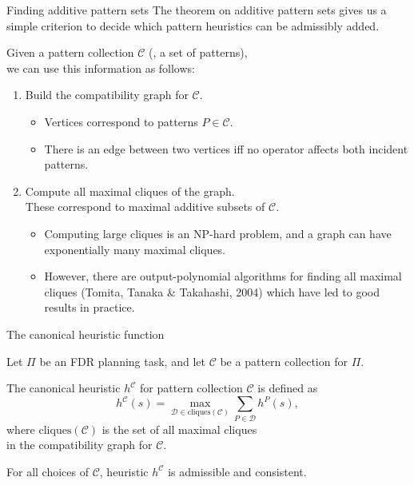 \documentclass{gkibeamer}
\newcommand{\cliques}{\ensuremath{\textrm{cliques}}}
\begin{document}
\begin{frame}{Finding additive pattern sets}
  The theorem on additive pattern sets gives us a simple criterion to
  decide which pattern heuristics can be admissibly added.

  \smallskip

  Given a \alert{pattern collection $\mathcal C$} (\ie, a set of
  patterns), \\ we can use this information as follows:
  \begin{enumerate}
  \item Build the \alert{compatibility graph} for $\mathcal C$.
    \begin{itemize}
    \item Vertices correspond to patterns $P \in \mathcal C$.
    \item There is an edge between two vertices iff no operator
      affects both incident patterns.
    \end{itemize}
  \item Compute \alert{all maximal cliques} of the graph. \\
    These correspond to maximal additive subsets of $\mathcal C$.
    \begin{itemize}
    \item Computing large cliques is an NP-hard problem, and a
      graph can have exponentially many maximal cliques.
    \item However, there are \alert{output-polynomial} algorithms for
      finding all maximal cliques (Tomita, Tanaka \& Takahashi, 2004)
      which have led to good results in practice.
    \end{itemize}
  \end{enumerate}
\end{frame}

\begin{frame}{The canonical heuristic function}
  \begin{definition}
    Let $\Pi$ be an FDR planning task, and
    let $\mathcal C$ be a pattern collection for $\Pi$.

    \smallskip

    The \alert{canonical heuristic $h^{\mathcal C}$}
    for pattern collection $\mathcal C$ is defined as
    \[
    h^{\mathcal C}(s) =
    \max_{\mathcal D \in \cliques(\mathcal C)}
    \sum_{P \in \mathcal D} h^P(s),\]
    where $\cliques(\mathcal C)$ is the set of all maximal cliques \\
    in the compatibility graph for $\mathcal C$.
  \end{definition}
  
  For all choices of $\mathcal C$, heuristic $h^{\mathcal C}$ is
  admissible and consistent.
\end{frame}
\end{document}

